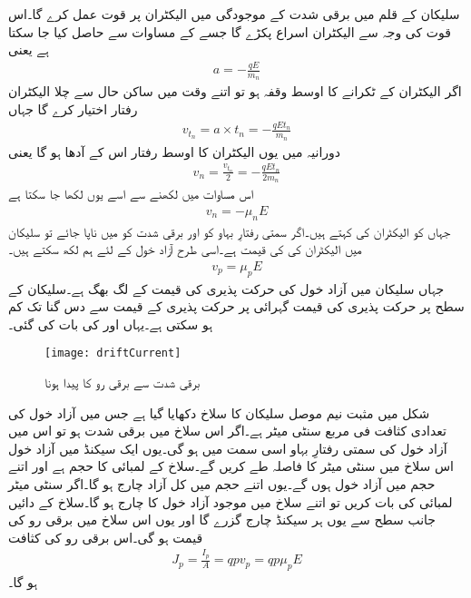 سلیکان کے قلم میں برقی شدت  کے موجودگی میں الیکٹران پر قوت  عمل کرے گا۔اس قوت کی وجہ سے الیکٹران اسراع   پکڑے گا جسے  کے مساوات   سے حاصل کیا جا سکتا ہے یعنی
\begin{align*}
a=-\frac{q E}{m_n}
\end{align*}
اگر الیکٹران کے ٹکرانے کا اوسط وقفہ   ہو تو اتنے وقت میں ساکن حال سے چلا الیکٹران رفتار  اختیار کرے گا جہاں
\begin{align*}
v_{t_n}= a \times t_n = -\frac{q E t_n}{m_n}
\end{align*}
دورانیہ  میں یوں الیکٹران کا اوسط رفتار اس کے آدھا ہو گا یعنی
\begin{align*}
v_n =\frac{v_{t_n}}{2}=-\frac{q E t_n}{2 m_n}
\end{align*}
اس مساوات میں  لکھنے سے اسے یوں لکھا جا سکتا ہے
\begin{align}
v_n = -\mu_n E
\end{align}
جہاں   کو الیکٹران کی  کہتے ہیں۔اگر سمتی رفتارِ بہاو کو  اور برقی شدت کو  میں ناپا جائے تو سلیکان میں الیکٹران کی   کی قیمت  ہے۔اسی طرح آزاد خول کے لئے ہم لکھ سکتے ہیں۔
\begin{align}
v_p = \mu_p E
\end{align}
جہاں سلیکان میں آزاد خول کی حرکت پذیری  کی قیمت  کے لگ بھگ ہے۔سلیکان کے سطح پر حرکت پذیری کی قیمت گہرائی پر حرکت پذیری کے قیمت سے دس گنا تک کم ہو سکتی ہے۔یہاں  اور  کی بات کی گئی۔
\begin{figure}
\centering
\texttt{[image: driftCurrent]}
\caption{ برقی شدت سے برقی رو کا پیدا ہونا}
\label{شکل_برقی_شدت_سے_پیدا_برقی_رو}
\end{figure}
شکل   میں مثبت نیم موصل سلیکان کا سلاخ دکھایا گیا ہے جس میں آزاد خول کی تعدادی کثافت   فی مربع سنٹی میٹر ہے۔اگر اس سلاخ میں برقی شدت  ہو تو اس میں آزاد خول کی سمتی رفتارِ بہاو  اسی سمت میں ہو گی۔یوں ایک سیکنڈ میں آزاد خول اس سلاخ میں  سنٹی میٹر کا فاصلہ طے کریں گے۔سلاخ کے لمبائی  کا حجم  ہے اور اتنے حجم میں   آزاد خول ہوں گے۔یوں اتنے حجم میں کل آزاد چارج   ہو گا۔اگر  سنٹی میٹر لمبائی کی بات کریں تو اتنے سلاخ میں موجود آزاد خول کا چارج  ہو گا۔سلاخ کے دائیں جانب سطح   سے یوں ہر سیکنڈ  چارج گزرے گا اور یوں اس سلاخ میں برقی رو  کی قیمت  ہو گی۔اس برقی رو کی کثافت 
\begin{align}
J_p = \frac{I_p}{A}=q p v_p = q p \mu_p E
\end{align}
ہو گا۔

